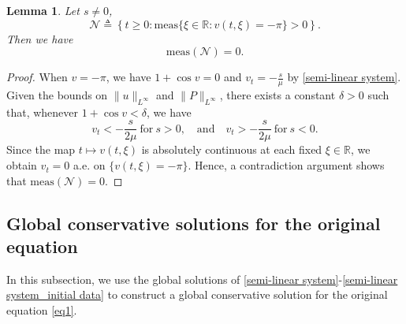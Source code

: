 \documentclass[10pt]{article}
\newtheorem{lemm}[theo]{Lemma}
\numberwithin{equation}{section}
\begin{document}
	\begin{lemm}\label{lemma_N}
		Let $s\neq0$, 
		$$\mathcal{N}\triangleq\left\{t\geq0:\mathrm{meas}\{\xi\in \mathbb{R}:v(t,\xi)=-\pi\}>0\right\}.$$
		Then we have
		$$\mathrm{meas}(\mathcal{N})=0.$$
	\end{lemm}
	\begin{proof}
		When $v=-\pi$, we have $1+\cos v=0$ and $v_t=-\frac{s}{\mu}$ by \eqref{semi-linear system}. Given the bounds on $\|u\|_{L^\infty}$ and $\|P\|_{L^\infty}$, there exists a constant $\delta>0$ such that,  whenever $1+\cos v<\delta$, we have 
		$$v_t<-\frac{s}{2\mu}\ \mathrm{for}\ s>0, \quad \mathrm{and}\quad v_t>-\frac{s}{2\mu}\ \mathrm{for}\ s<0.$$
		Since the map $t\mapsto v(t,\xi)$ is absolutely continuous at each fixed $\xi\in\mathbb{R}$, we obtain $v_t=0$ a.e. on $\{v(t,\xi)=-\pi\}$. Hence, a contradiction argument shows that $\mathrm{meas}(\mathcal{N})=0$.
	\end{proof}
	
	\subsection{Global conservative solutions for the original equation}
	In this subsection, we use the global solutions of \eqref{semi-linear system}-\eqref{semi-linear system_initial data} to construct a global conservative solution for the original equation \eqref{eq1}.
	
\end{document}
